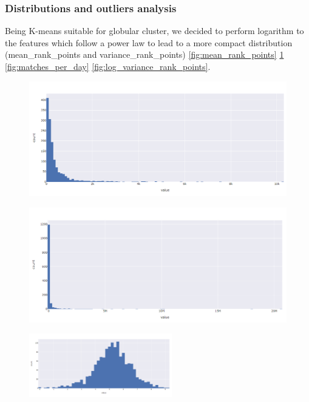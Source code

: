 \documentclass{article}
\begin{document}
\subsubsection{Distributions and outliers analysis}
Being K-means suitable for globular cluster, we decided to perform logarithm to the features which follow a power law to lead to a more compact distribution (mean\_rank\_points and variance\_rank\_points) \ref{fig:mean_rank_points} \ref{fig:matches_per_year_and_month} \ref{fig:matches_per_day} \ref{fig:log_variance_rank_points}.

\begin{figure}[h]
\centering
\begin{minipage}{.5\textwidth}
\centering
\includegraphics[width=\textwidth]{mean_rank_points}
\label{fig:mean_rank_points}
\end{minipage}%
\begin{minipage}{.5\textwidth}
\centering
\includegraphics[width=\textwidth]{variance_rank_points}
\label{fig:matches_per_year_and_month}
\end{minipage}
\begin{minipage}{.5\textwidth}
\centering
\includegraphics[width=235px]{log_mean_rank_points}

\end{minipage}
\end{figure}
\end{document}
